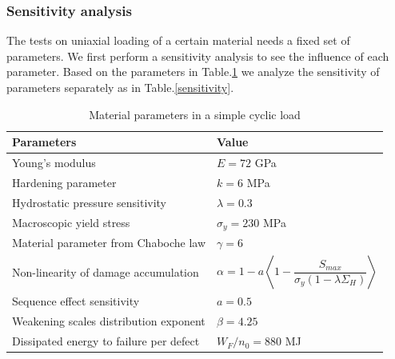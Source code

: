 \documentclass[3p,times,number,review]{elsarticle}
\begin{document}
\subsubsection{Sensitivity analysis}
The tests on uniaxial loading of a certain material needs a fixed set of parameters. We first perform a sensitivity analysis to see the influence of each parameter. Based on the parameters in Table.\ref{cyclic para} we analyze the sensitivity of parameters separately as in Table.\ref{sensitivity}.
\begin{table}[!h]
	\centering
	\begin{tabular}{ll}
		\hline
		\textbf{Parameters}                                         & \textbf{Value}                    \\ \hline
		Young's modulus                                             & $E=72$ GPa                       \\
		Hardening parameter                                         &  $k=6$ MPa \\
		Hydrostatic pressure sensitivity                            & $\lambda=0.3$                     \\
		Macroscopic yield stress                                    & $\sigma_y=230$ MPa              \\
		Material parameter from Chaboche law & $\gamma=6$                        \\
		Non-linearity of damage accumulation & $\alpha=1-a\left\langle 1-\dfrac{S_{max}}{\sigma_y\left( 1-\lambda\Sigma_{H}\right) } \right\rangle $                        \\
		Sequence effect sensitivity  & $a=0.5$             \\
		Weakening scales distribution exponent                      & $\beta=4.25$                             \\
		Dissipated energy to failure per defect               & $W_F/n_0=880$ MJ                       \\  \hline
	\end{tabular}
	\caption{Material parameters in a simple cyclic load }
	\label{cyclic para}
\end{table}
\end{document}
